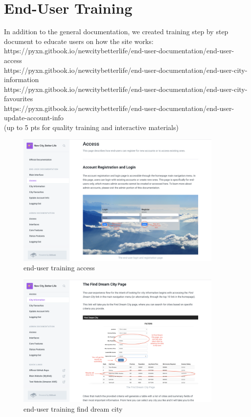 \documentclass[12pt, letterpaper]{article}
\begin{document}
 \newpage


\section{End-User Training}
In addition to the general documentation, we created training step by step document to educate users on how the site works: \\https://pyxn.gitbook.io/newcitybetterlife/end-user-documentation/end-user-access
\\https://pyxn.gitbook.io/newcitybetterlife/end-user-documentation/end-user-city-information
\\https://pyxn.gitbook.io/newcitybetterlife/end-user-documentation/end-user-city-favourites
\\https://pyxn.gitbook.io/newcitybetterlife/end-user-documentation/end-user-update-account-info
\\(up to 5 pts for quality training and interactive materials)

 \begin{figure}[htbp]
	\centering
	\includegraphics[width=4in]{images/q13.png}
	\caption{end-user training access}
 \end{figure}
 
 \begin{figure}[htbp]
	\centering
	\includegraphics[width=4in]{images/q13_2.png}
	\caption{end-user training find dream city}
 \end{figure}
 
\end{document}
